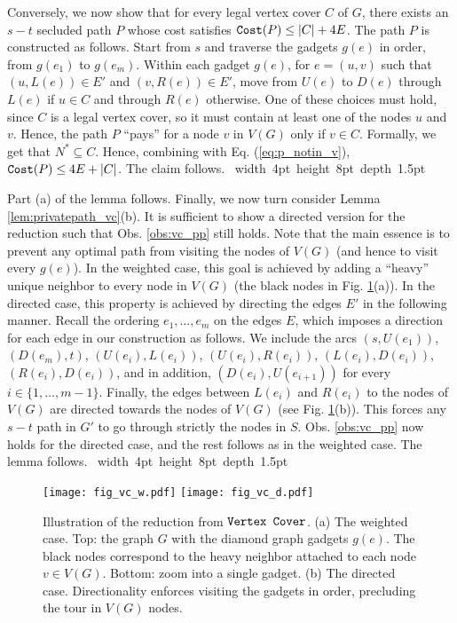 \documentclass[12pt]{article}
\def\Cost{\mbox{\tt Cost}}
\def\blackslug{\hbox{\hskip 1pt \vrule width 4pt height 8pt
    depth 1.5pt \hskip 1pt}}
\def\QED{\quad\blackslug\lower 8.5pt\null\par}
\newcommand{\VC}[0]{\mbox{\tt Vertex Cover}}
\def\Cost{\mbox{\tt Cost}}
\begin{document}
Conversely, we now show that for every legal vertex cover $C$ of $G$, there exists an
$s-t$ secluded path $P$ whose cost satisfies $\Cost(P) \leq |C|+4E$. The path $P$ is constructed as follows. Start from $s$ and traverse the gadgets $g(e)$ in order, from $g(e_1)$ to $g(e_m)$. Within each gadget $g(e)$, for $e=(u,v)$ such that $(u,L(e)) \in E'$ and $(v,R(e)) \in E'$,
move from $U(e)$ to $D(e)$ through $L(e)$ if $u \in C$ and through $R(e)$ otherwise. One of these choices must hold, since $C$ is a legal vertex cover, so it must contain at least one of the nodes $u$ and $v$. Hence, the path $P$ ``pays'' for a node $v$ in $V(G)$ only if $v \in C$. Formally, we get that $N^{*} \subseteq C$. Hence, combining with Eq. (\ref{eq:p_notin_v}), $\Cost(P) \leq 4E+|C|$. The claim follows.
\QED
Part (a) of the lemma follows.
Finally, we now turn consider Lemma \ref{lem:privatepath_vc}(b).
It is sufficient to show a directed version for the reduction such that Obs. \ref{obs:vc_pp} still holds. Note that the main essence is to prevent any optimal path from visiting the nodes of $V(G)$ (and hence to visit every $g(e)$). In the weighted case, this goal is achieved by adding a ``heavy'' unique neighbor to every node in $V(G)$ (the black nodes in Fig. \ref{fig:vc}(a)). In the directed case, this property is achieved by directing the edges $E'$ in the following manner.
Recall the ordering $e_1, \ldots, e_m$ on the edges $E$, which imposes a direction for each edge in our construction as follows.
We include the arcs $(s, U(e_1))$, $(D(e_m), t)$, $(U(e_i), L(e_i))$, $(U(e_i), R(e_i))$, $(L(e_i),D(e_i))$, $(R(e_i),D(e_i))$, and in addition, $(D(e_i), U(e_{i+1}))$ for every $i \in \{1, \ldots,m-1\}$. Finally, the edges between $L(e_i)$ and $R(e_i)$ to the nodes of $V(G)$ are directed towards the nodes of $V(G)$ (see Fig. \ref{fig:vc}(b)).  This forces any $s-t$ path in $G'$ to go through strictly the nodes in $S$. Obs. \ref{obs:vc_pp} now holds for the directed case, and the rest follows as in the weighted case. The lemma follows.
\QED
\begin{figure}[h!]
\begin{center}
\texttt{[image: fig\_vc\_w.pdf]}
\hfill
\texttt{[image: fig\_vc\_d.pdf]}
\caption{ \label{fig:vc}
\sf
Illustration of the reduction from $\VC$. (a) The weighted case. Top: the graph $G$ with the diamond graph gadgets $g(e)$. The black nodes correspond to the heavy neighbor attached to each node $v \in V(G)$. Bottom: zoom into a single gadget. (b) The directed case. Directionality enforces visiting the gadgets in order, precluding the tour in $V(G)$ nodes.
}
\end{center}
\end{figure}
\end{document}
